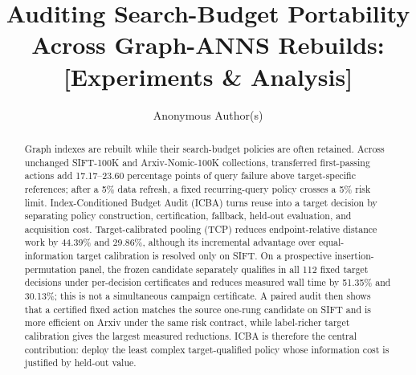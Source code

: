 \documentclass[sigconf,anonymous]{acmart}
\title[Auditing Search-Budget Portability]{Auditing Search-Budget Portability Across Graph-ANNS Rebuilds: [Experiments \& Analysis]}
\author{Anonymous Author(s)}
\begin{document}
\begin{abstract}
Graph indexes are rebuilt while their search-budget policies are often retained. Across unchanged SIFT-100K and Arxiv-Nomic-100K collections, transferred first-passing actions add 17.17--23.60 percentage points of query failure above target-specific references; after a 5\% data refresh, a fixed recurring-query policy crosses a 5\% risk limit. Index-Conditioned Budget Audit (ICBA) turns reuse into a target decision by separating policy construction, certification, fallback, held-out evaluation, and acquisition cost. Target-calibrated pooling (TCP) reduces endpoint-relative distance work by 44.39\% and 29.86\%, although its incremental advantage over equal-information target calibration is resolved only on SIFT. On a prospective insertion-permutation panel, the frozen candidate separately qualifies in all 112 fixed target decisions under per-decision certificates and reduces measured wall time by 51.35\% and 30.13\%; this is not a simultaneous campaign certificate. A paired audit then shows that a certified fixed action matches the source one-rung candidate on SIFT and is more efficient on Arxiv under the same risk contract, while label-richer target calibration gives the largest measured reductions. ICBA is therefore the central contribution: deploy the least complex target-qualified policy whose information cost is justified by held-out value.
\end{abstract}
\maketitle
\raggedbottom











\balance


\end{document}

